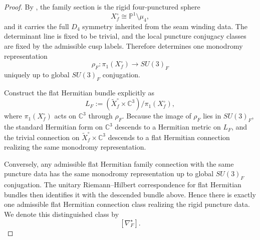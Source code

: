 \documentclass[11pt,a4paper]{article}
\theoremstyle{definition}
\theoremstyle{remark}
\begin{document}
\begin{proof}
By , the family section is the rigid four-punctured sphere
\[
X_f^\circ\cong\mathbb P^1\setminus\mu_4,
\]
and it carries the full $D_4$ symmetry inherited from the seam winding data. The determinant line
is fixed to be trivial, and the local puncture conjugacy classes are fixed by the admissible cusp
labels. Therefore  determines one monodromy representation
\[
\rho_F:\pi_1(X_f^\circ)\to SU(3)_F
\]
uniquely up to global $SU(3)_F$ conjugation.

Construct the flat Hermitian bundle explicitly as
\[
L_F:=(\widetilde X_f^\circ\times\mathbb C^3)/\pi_1(X_f^\circ),
\]
where $\pi_1(X_f^\circ)$ acts on $\mathbb C^3$ through $\rho_F$. Because the image of $\rho_F$ lies
in $SU(3)_F$, the standard Hermitian form on $\mathbb C^3$ descends to a Hermitian metric on
$L_F$, and the trivial connection on $\widetilde X_f^\circ\times\mathbb C^3$ descends to a flat
Hermitian connection realizing the same monodromy representation.

Conversely, any admissible flat Hermitian family connection with the same puncture data has the same
monodromy representation up to global $SU(3)_F$ conjugation. The unitary Riemann--Hilbert
correspondence for flat Hermitian bundles then identifies it with the descended bundle above.
Hence there is exactly one admissible flat Hermitian connection class realizing the rigid puncture
data. We denote this distinguished class by
\[
[\nabla_F^\star].
\]
\end{proof}
\end{document}
